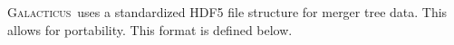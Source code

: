 \documentclass[letterpaper,10pt,headsepline]{scrbook}
\def\glc{{\normalfont \scshape Galacticus}}
\begin{document}
\glc\ uses a standardized HDF5 file structure for merger tree data. This allows for portability. This format is defined below.







\backmatter




\printglossaries

\citeindextrue
\printindex
\printindex[code]
\end{document}
